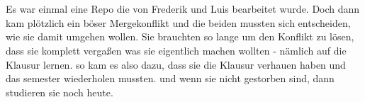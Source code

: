 
\newcommand{\germanQuote}[1]{„\textit{#1}“}
\newcommand{\englishQuote}[1]{``\textit{#1}''}



\chapter{\chapterOne}
Es war einmal eine Repo die von Frederik und Luis bearbeitet wurde.
Doch dann kam plötzlich ein böser Mergekonflikt und die beiden mussten sich entscheiden, wie sie damit umgehen wollen.
Sie brauchten so lange um den Konflikt zu lösen, dass sie komplett vergaßen was sie eigentlich machen wollten - nämlich auf die Klausur lernen.
so kam es also dazu, dass sie die Klausur verhauen haben und das semester wiederholen mussten.
und wenn sie nicht gestorben sind, dann studieren sie noch heute.

